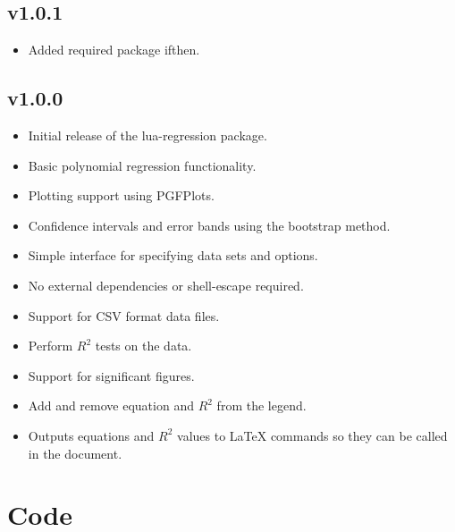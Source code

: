 \documentclass[11pt]{article}
\begin{document}
    \subsection*{v1.0.1}
    
    \begin{itemize}
    	\item Added required package {\ttfamily ifthen}.
    \end{itemize}

    \subsection*{v1.0.0}

    \begin{itemize}
        \item Initial release of the {\ttfamily lua-regression} package.
        \item Basic polynomial regression functionality.
        \item Plotting support using PGFPlots.
        \item Confidence intervals and error bands using the bootstrap method.
        \item Simple interface for specifying data sets and options.
        \item No external dependencies or {\ttfamily shell-escape} required.
        \item Support for CSV format data files.
        \item Perform $R^2$ tests on the data.
        \item Support for significant figures.
        \item Add and remove equation and $R^2$ from the legend.
        \item Outputs equations and $R^2$ values to LaTeX commands so they can be called in the document.
    \end{itemize}

    \pagebreak

    \section{Code}

    \inputminted[autogobble, breaklines, breakanywhere, firstline=22, linenos]{latex}{../tex/lua-regression.sty}
\end{document}
